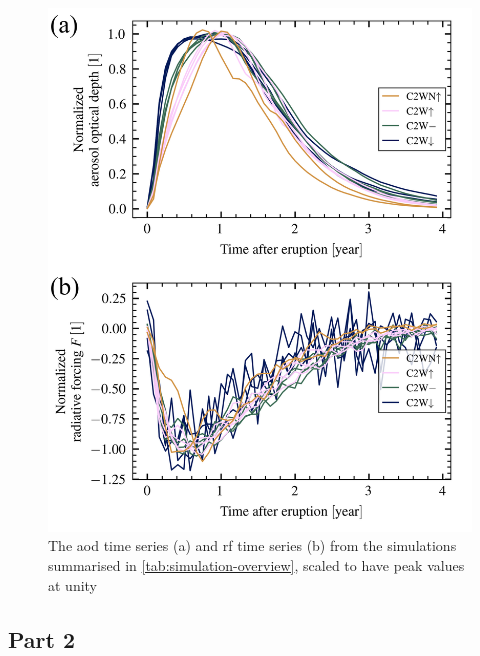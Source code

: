 \documentclass[twocol]{ametsocV6.1}
\begin{document}
\begin{figure}
  \centering
  \includegraphics[width=0.95\linewidth]{figures/arrays_combined_normalized.png}

  \caption{The \gls{aod} time series (a) and \gls{rf} time
    series (b) from the simulations summarised in
    \ref{tab:simulation-overview}, scaled to have peak values at unity
  }\label{fig:arrays_normalised}
\end{figure}

\subsection{Part 2}
\end{document}
